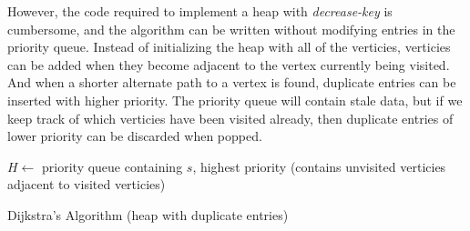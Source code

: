 \documentclass[12pt, titlepage]{article}
\begin{document}
However, the code required to implement a heap with \textit{decrease-key} is cumbersome, and the algorithm can be written without modifying entries in the priority queue. Instead of initializing the heap with all of the verticies, verticies can be added when they become adjacent to the vertex currently being visited. And when a shorter alternate path to a vertex is found, duplicate entries can be inserted with higher priority. The priority queue will contain stale data, but if we keep track of which verticies have been visited already, then duplicate entries of lower priority can be discarded when popped. \\

\begin{algorithm}[H]
  \SetAlgoLined
  \DontPrintSemicolon

  $H \longleftarrow$\hspace{0.5mm} priority queue containing $s$, highest priority\;
  \hspace{13mm}(contains unvisited verticies adjacent to visited verticies)\;

  \;
    \caption{Dijkstra's Algorithm (heap with duplicate entries)}
\end{algorithm} \medskip
\end{document}
